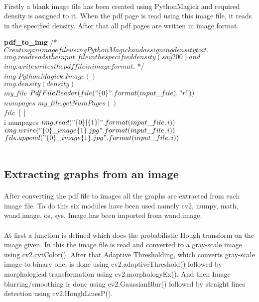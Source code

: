 \documentclass[12pts]{scrreprt}
\begin{document}
\paragraph{}
Firstly a blank image file has been created using PythonMagick and required density is assigned to it. When the pdf page is read using this image file, it reads in the specified density. After that all pdf pages are written in image format.
\begin{pseudocode}{\textbf{pdf_to_img}}{ }
/\mbox{*}$ Creating an image file using PythonMagick and assigning density to it.$\\ $img.read reads the input\_file in the specified density(say 200) and $\\$img.write writes the pdf file in image format. $ \mbox{*}/\\
$img $ \GETS $ PythonMagick.Image() $\\
$img.density(density) $\\
$my\_file $ \GETS $ PdfFileReader(file("\{0\}".format(input\_file),"r")) $\\
$numpages $ \GETS $ my\_file.getNumPages() $\\
$file $ \GETS $ [ ] $\\ 
\FOR i  \TO numpages \DO
\BEGIN
$img.read("\{0\}[\{1\}]".format(input\_file,i))$\\
$img.wrire("\{0\}\_image\{1\}.jpg".format(input\_file,i))$\\
$file.append("\{0\}\_image\{1\}.jpg".format(input\_file,i))$\\
\END\\
\end{pseudocode}
\subsection{Extracting graphs from an image}
\paragraph{}
After converting the pdf file to images all the graphs are extracted from each image file. To do this six modules have been used namely cv2, numpy, math, wand.image, os, sys. Image has been imported from wand.image.
\paragraph{}
At first a function is defined which does the probabilistic Hough transform on the image given. In this the image file is read and converted to a gray-scale image using cv2.cvtColor(). After that Adaptive Thresholding, which converts gray-scale image to binary one, is done using cv2.adaptiveThreshold() followed by morphological transformation using cv2.morphologyEx(). And then Image blurring/smoothing is done using cv2.GaussianBlur() followed by straight lines detection using cv2.HoughLinesP().
\end{document}

